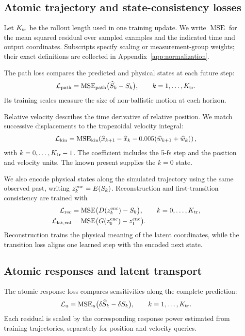 \documentclass[11pt,a4paper]{article}
\numberwithin{equation}{section}
\newcommand{\MSE}{\operatorname{MSE}}
\begin{document}
\subsection{Atomic trajectory and state-consistency losses}

Let $K_{\rm tr}$ be the rollout length used in one training update. We write
$\MSE$ for the mean squared residual over sampled examples and the indicated
time and output coordinates. Subscripts specify scaling or measurement-group
weights; their exact definitions are collected in
Appendix~\ref{app:normalization}.

The path loss compares the predicted and physical states at each future step:
\begin{equation}
\mathcal L_{\rm path}
=\MSE_{\rm path}\bigl(\widehat S_k-S_k\bigr),
\qquad k=1,\ldots,K_{\rm tr}.
\label{eq:path-loss}
\end{equation}
Its training scales measure the size of non-ballistic motion at each horizon.

Relative velocity describes the time derivative of relative position.
We match successive displacements to the trapezoidal velocity integral:
\begin{equation}
\mathcal L_{\rm kin}
=\MSE_{\rm kin}\!\left(
\widehat x_{k+1}-\widehat x_k
-0.005(\widehat w_{k+1}+\widehat w_k)\right),
\label{eq:kinematic-loss}
\end{equation}
with $k=0,\ldots,K_{\rm tr}-1$. The coefficient includes the 5-fs step and
the position and velocity units. The known present supplies the $k=0$ state.

We also encode physical states along the simulated trajectory using the
same observed past, writing $z_k^{\rm enc}=E(S_k)$. Reconstruction and
first-transition consistency are trained with
\begin{align}
\mathcal L_{\rm rec}
&=\MSE\bigl(D(z_k^{\rm enc})-S_k\bigr),
\qquad k=0,\ldots,K_{\rm tr},\\
\mathcal L_{\rm lat,val}
&=\MSE\bigl(G(z_0^{\rm enc})-z_1^{\rm enc}\bigr).
\end{align}
Reconstruction trains the physical meaning of the latent coordinates,
while the transition loss aligns one learned step with the encoded next state.

\subsection{Atomic responses and latent transport}

The atomic-response loss compares sensitivities along the complete prediction:
\begin{equation}
\mathcal L_u=\MSE_u\bigl(\delta\widehat S_k-\delta S_k\bigr),
\qquad k=1,\ldots,K_{\rm tr}.
\end{equation}
Each residual is scaled by the corresponding response power estimated from
training trajectories, separately for position and velocity queries.
\end{document}
